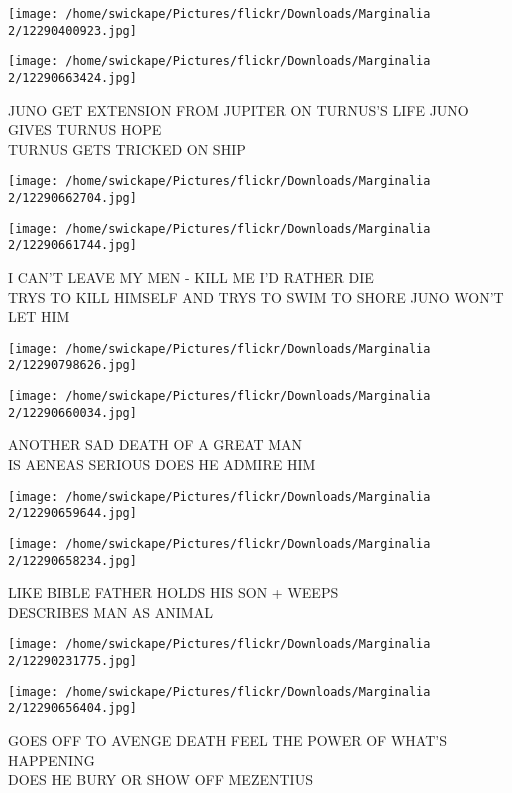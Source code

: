 \documentclass[10pt,letterpaper]{article}
\begin{document}
\texttt{[image: /home/swickape/Pictures/flickr/Downloads/Marginalia 2/12290400923.jpg]}

\vspace{0.25in}
\texttt{[image: /home/swickape/Pictures/flickr/Downloads/Marginalia 2/12290663424.jpg]}

JUNO GET EXTENSION FROM JUPITER ON TURNUS'S LIFE JUNO GIVES TURNUS HOPE\\
TURNUS GETS TRICKED ON SHIP
\pagebreak

\texttt{[image: /home/swickape/Pictures/flickr/Downloads/Marginalia 2/12290662704.jpg]}

\vspace{0.25in}
\texttt{[image: /home/swickape/Pictures/flickr/Downloads/Marginalia 2/12290661744.jpg]}

I CAN'T LEAVE MY MEN {-} KILL ME I'D RATHER DIE\\
TRYS TO KILL HIMSELF AND TRYS TO SWIM TO SHORE JUNO WON'T LET HIM
\pagebreak

\texttt{[image: /home/swickape/Pictures/flickr/Downloads/Marginalia 2/12290798626.jpg]}

\vspace{0.25in}
\texttt{[image: /home/swickape/Pictures/flickr/Downloads/Marginalia 2/12290660034.jpg]}

ANOTHER SAD DEATH OF A GREAT MAN\\
IS AENEAS SERIOUS DOES HE ADMIRE HIM
\pagebreak

\texttt{[image: /home/swickape/Pictures/flickr/Downloads/Marginalia 2/12290659644.jpg]}

\vspace{0.25in}
\texttt{[image: /home/swickape/Pictures/flickr/Downloads/Marginalia 2/12290658234.jpg]}

LIKE BIBLE FATHER HOLDS HIS SON + WEEPS\\
DESCRIBES MAN AS ANIMAL
\pagebreak

\texttt{[image: /home/swickape/Pictures/flickr/Downloads/Marginalia 2/12290231775.jpg]}

\vspace{0.25in}
\texttt{[image: /home/swickape/Pictures/flickr/Downloads/Marginalia 2/12290656404.jpg]}

GOES OFF TO AVENGE DEATH FEEL THE POWER OF WHAT'S HAPPENING\\
DOES HE BURY OR SHOW OFF MEZENTIUS
\pagebreak
\end{document}
